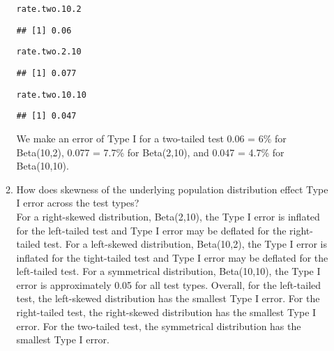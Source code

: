 \documentclass{article}\usepackage[]{graphicx}\usepackage[]{xcolor}
\makeatletter
\newcommand{\hldef}[1]{\textcolor[rgb]{0.345,0.345,0.345}{#1}}%
\newenvironment{kframe}{%
 \def\at@end@of@kframe{}%
 \ifinner\ifhmode%
  \def\at@end@of@kframe{\end{minipage}}%
  \begin{minipage}{\columnwidth}%
 \fi\fi%
 \def\FrameCommand##1{\hskip\@totalleftmargin \hskip-\fboxsep
 \colorbox{shadecolor}{##1}\hskip-\fboxsep
     \hskip-\linewidth \hskip-\@totalleftmargin \hskip\columnwidth}%
 \MakeFramed {\advance\hsize-\width
   \@totalleftmargin\z@ \linewidth\hsize
   \@setminipage}}%
 {\par\unskip\endMakeFramed%
 \at@end@of@kframe}
\newenvironment{knitrout}{}{} %
\makeatother
\begin{document}
\begin{enumerate}
\begin{enumerate}
\begin{knitrout}
\begin{kframe}
\begin{alltt}
\hldef{rate.two.10.2}
\end{alltt}
\begin{verbatim}
## [1] 0.06
\end{verbatim}
\begin{alltt}
\hldef{rate.two.2.10}
\end{alltt}
\begin{verbatim}
## [1] 0.077
\end{verbatim}
\begin{alltt}
\hldef{rate.two.10.10}
\end{alltt}
\begin{verbatim}
## [1] 0.047
\end{verbatim}
\end{kframe}
\end{knitrout}
We make an error of Type I for a two-tailed test 0.06 = 6\% for Beta(10,2),  0.077 = 7.7\% for Beta(2,10), and 0.047 = 4.7\% for Beta(10,10).
    \item How does skewness of the underlying population distribution effect
    Type I error across the test types? \\
    For a right-skewed distribution, Beta(2,10), the Type I error is inflated for the left-tailed test and Type I error may be deflated for the right-tailed test. For a left-skewed distribution, Beta(10,2), the Type I error is inflated for the tight-tailed test and Type I error may be deflated for the left-tailed test. For a symmetrical distribution, Beta(10,10), the Type I error is approximately 0.05 for all test types.
    Overall, for the left-tailed test, the left-skewed distribution has the smallest Type I error. For the right-tailed test, the right-skewed distribution has the smallest Type I error. For the two-tailed test, the symmetrical distribution has the smallest Type I error.  
  \end{enumerate}
\end{enumerate}

\end{document}
